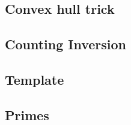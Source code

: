 \documentclass[12pt]{extarticle}
\begin{document}
\begin{multicols*}{2}

\subsection{Convex hull trick} %


% 

% 

% 


\subsection{Counting Inversion} %


\subsection{Template} %


\subsection{Primes} %


\end{multicols*}
\end{document}
